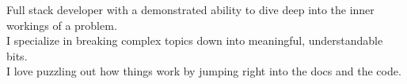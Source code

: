 \documentclass[]{deedy-resume-openfont}
\begin{document}


{
	\location{}
	\begin{center}
	Full stack developer with a demonstrated ability to dive deep into the inner workings of a problem. \\
	I specialize in breaking complex topics down into meaningful, understandable bits. \\
	I love puzzling out how things work by jumping right into the docs and the code.
	\end{center}
}


\end{document}
